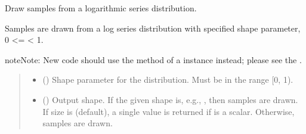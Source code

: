 \documentclass[letterpaper,10pt,english]{sphinxmanual}
\begin{document}

\begin{fulllineitems}
\label{\detokenize{metilda.controllers:metilda.controllers.pitch_art_wizard.logseries}}
\pysigstartsignatures
{}
\pysigstopsignatures
\sphinxAtStartPar
Draw samples from a logarithmic series distribution.

\sphinxAtStartPar
Samples are drawn from a log series distribution with specified
shape parameter, 0 \textless{}=  \textless{} 1.

\begin{sphinxadmonition}{note}{Note:}
\sphinxAtStartPar
New code should use the 
method of a  instance instead;
please see the .
\end{sphinxadmonition}
\begin{quote}\begin{description}
\begin{itemize}
\item {} 
\sphinxAtStartPar
{} () \textendash{} Shape parameter for the distribution.  Must be in the range {[}0, 1).

\item {} 
\sphinxAtStartPar
{} (\sphinxstyleliteralemphasis{\sphinxupquote{, }}) \textendash{} Output shape.  If the given shape is, e.g., , then
 samples are drawn.  If size is  (default),
a single value is returned if  is a scalar.  Otherwise,
 samples are drawn.


\end{itemize}
\end{description}
\end{quote}
\end{fulllineitems}
\end{document}
